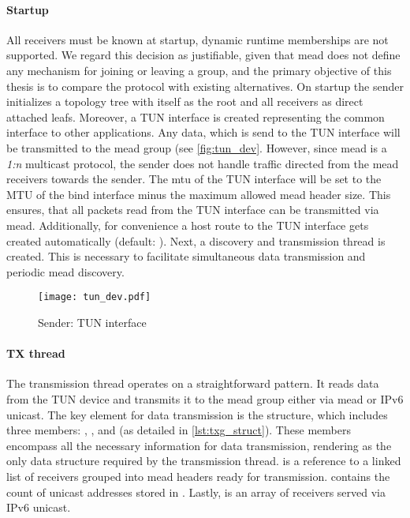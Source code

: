 \paragraph{Startup} %
\label{par:Startup}
All receivers must be known at startup, dynamic runtime memberships are not
    supported.
We regard this decision as justifiable, given that \gls{mead} does not define any
    mechanism for joining or leaving a group, and the primary objective of this
    thesis is to compare the protocol with existing alternatives.
On startup the sender initializes a topology tree with itself as the root and
    all receivers as direct attached leafs.
Moreover, a TUN interface is created representing the common interface to other
    applications.
Any data, which is send to the TUN interface will be transmitted to the
    \gls{mead} group (see \autoref{fig:tun_dev}.
However, since \gls{mead} is a \textit{1:n} multicast protocol, the sender does not
    handle traffic directed from the \gls{mead} receivers towards the sender.
The \gls{mtu} of the TUN interface will be set to the MTU of the bind interface
    minus the maximum allowed \gls{mead} header size.
This ensures, that all packets read from the TUN interface can be transmitted
    via \gls{mead}.
Additionally, for convenience a host route to the TUN interface gets created 
    automatically (default: ).
Next, a discovery and transmission thread is created.
This is necessary to facilitate simultaneous data transmission and periodic
    \gls{mead} discovery.

\begin{figure}
    \begin{center}
        \texttt{[image: tun\_dev.pdf]}
    \end{center}
    \caption{Sender: TUN interface}
    \label{fig:tun_dev}
\end{figure}

\paragraph{TX thread} %
\label{par:TX thread}
The transmission thread operates on a straightforward pattern.
It reads data from the TUN device and transmits it to the \gls{mead} group either
    via \gls{mead} or IPv6 unicast.
The key element for data transmission is the  structure,
    which includes three members: , , and
     (as detailed in \autoref{lst:txg_struct}).
These members encompass all the necessary information for data transmission,
    rendering  as the only data structure required by the
    transmission thread.
 is a reference to a linked list of receivers grouped into
    \gls{mead} headers ready for transmission.
 contains the count of unicast addresses stored in
    .
Lastly,  is an array of receivers served via IPv6 unicast.


